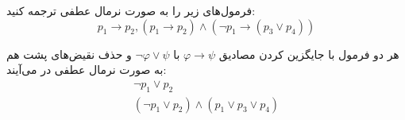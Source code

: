 فرمول‌های زیر را به صورت نرمال عطفی ترجمه کنید:
$$p_1\to p_2, (p_1\to p_2)\wedge (\neg p_1\to (p_3\vee p_4))$$
\begin{ans}
    هر دو فرمول با جایگزین کردن مصادیق
    $\varphi\to\psi$
    با
    $\neg\varphi\vee\psi$
    و حذف نقیض‌های پشت هم به صورت نرمال عطفی در می‌آیند:
    \begin{gather*}
        \neg p_1\vee p_2 \\
        (\neg p_1\vee p_2)\wedge (p_1\vee p_3\vee p_4)
    \end{gather*}
\end{ans}